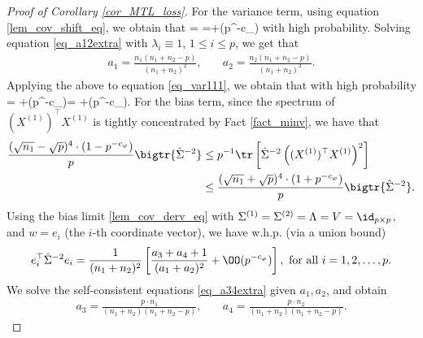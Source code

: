 \documentclass[aos,preprint]{imsart}
\begin{document}
\begin{proof}[Proof of Corollary \ref{cor_MTL_loss}]
For the variance term, using equation \eqref{lem_cov_shift_eq}, we obtain that
\be\label{eq_var111} = \tr{}=+\OO(p^{-c_\varphi})\ee
with high probability. Solving equation \eqref{eq_a12extra} with $\lambda_i\equiv 1$, $1\le i\le p$, we get that  
	\begin{align}
		 a_1 = \frac{n_1(n_1 + n_2 - p)}{(n_1 + n_2)^2} ,\quad
		& a_2 = \frac{n_2(n_1 + n_2 - p)}{(n_1 +n_2)^2} . \label{simplesovlea12}
			\end{align}
Applying the above to equation \eqref{eq_var111}, we obtain that with high probability
\be\label{eq_var112}  =  \cdot {}+\OO(p^{-c_\varphi})=  +\OO(p^{-c_\varphi}).\ee
For the bias term, since the spectrum of $(X^{(1)})^{\top} X^{(1)}$ is tightly concentrated by Fact \ref{fact_minv}, we have that
\begin{align}
 \frac{(\sqrt{n_1}-\sqrt{p})^4 \cdot (1- p^{-c_\varphi})}{p} \bigtr{\hat \Sigma^{-2}}  &\le {p}^{-1}\tr\left[\hat\Sigma^{-2} \left((X^{(1)})^\top X^{(1)} \right)^2\right] \label{eq_bias111}\\
 &\le \frac{(\sqrt{n_1}+\sqrt{p})^4 \cdot (1+ p^{-c_\varphi})}{p} \bigtr{\hat\Sigma^{-2}}.\nonumber
\end{align}
Using the bias limit \eqref{lem_cov_derv_eq} with $\Sigma^{(1)}=\Sigma^{(2)}=\Lambda=V=\id_{p\times p}$, and $w = e_i$ (the $i$-th coordinate vector), we have w.h.p. (via a union bound)
\begin{align*}%
 e_i^{\top}\hat\Sigma^{-2} e_i = \frac{1}{(n_1+n_2)^2} \left[\frac{a_3+a_4+1}{(a_1+a_2)^2} +\OO(p^{-c_\varphi})\right], \text{ for all } i = 1, 2, \dots, p.
\end{align*}
We solve the self-consistent equations \eqref{eq_a34extra} given $a_1, a_2$, and obtain
\begin{align*}
		a_3 = \frac{p\cdot n_1}{(n_1 +n_2)(n_1 +n_2 - p)}, \quad
		&  a_4 = \frac{p\cdot n_2}{(n_1 + n_2)(n_1 + n_2 - p)}. %

\end{align*}
\end{proof}
\end{document}
